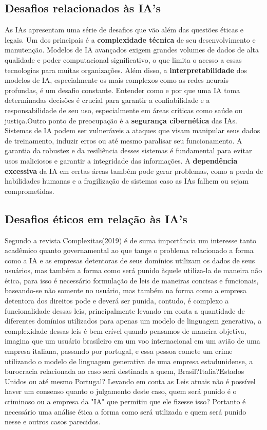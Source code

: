 \documentclass[12pt,a4paper]{article}
\begin{document}
   \subsection{Desafios relacionados às IA's}

      As IAs apresentam uma série de desafios que vão além das questões éticas e legais. Um dos principais é a \textbf{complexidade técnica} de seu desenvolvimento e manutenção. 
    Modelos de IA avançados exigem grandes volumes de dados de alta qualidade e poder computacional significativo, o que limita o acesso a essas tecnologias para muitas 
    organizações. Além disso, a \textbf{interpretabilidade} dos modelos de IA, especialmente os mais complexos como as redes neurais profundas, é um desafio constante. 
    Entender como e por que uma IA toma determinadas decisões é crucial para garantir a confiabilidade e a responsabilidade de seu uso, especialmente em áreas críticas 
    como saúde ou justiça.Outro ponto de preocupação é a \textbf{segurança cibernética} das IAs. Sistemas de IA podem ser vulneráveis a ataques que visam manipular seus 
    dados de treinamento, induzir erros ou até mesmo paralisar seu funcionamento. A garantia da robustez e da resiliência desses sistemas é fundamental para evitar usos 
    maliciosos e garantir a integridade das informações. A \textbf{dependência excessiva} da IA em certas áreas também pode gerar problemas, como a perda de habilidades 
    humanas e a fragilização de sistemas caso as IAs falhem ou sejam comprometidas.

    \subsection{Desafios éticos em relação às IA's}

      Segundo a revista Complexitas(2019)\citet{complexitas6633} é de suma importância um interesse tanto acadêmico quanto governamental ao que tange o 
    problema relacionado a forma como a IA e as empresas detentoras de seus domínios utilizam os dados de seus usuários, mas também a forma como será 
    punido àquele utiliza-la de maneira não ética, para isso é necessário formulação de leis de maneiras concisas e funcionais, baseando-se não somente no
    usuário, mas também na forma como a empresa detentora dos direitos pode e deverá ser punida, contudo, é complexo a funcionalidade dessas leis,
    principalmente levando em conta a quantidade de diferentes domínios utilizados para apenas um modelo de linguagem generativa, a complexidade dessas leis
    é bem crível quando pensamos de maneira objetiva, imagina que um usuário brasileiro em um voo internacional em um avião de uma empresa italiana, 
    passando por portugal, e essa pessoa comete um crime utilizando o modelo de linguagem generativa de uma empresa estadunidense, a burocracia relacionada
    ao caso será destinada a quem, Brasil?Italia?Estados Unidos ou até mesmo Portugal? Levando em conta as Leis atuais não é possível haver um consenso
    quanto o julgamento deste caso, quem será punido é o criminoso ou a empresa da "IA" que permitiu que ele fizesse isso? Portanto é necessário uma análise
    ética a forma como será utilizada e quem será punido nesse e outros casos parecidos.
\end{document}
